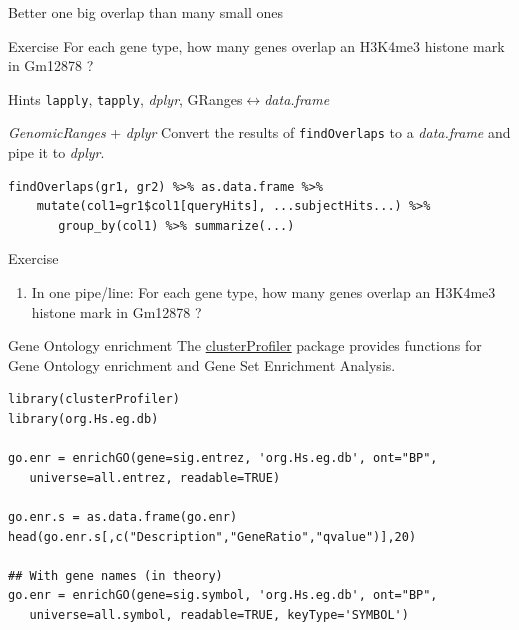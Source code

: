 \documentclass[10pt]{beamer}
\newcommand{\df}{{\it data.frame} }
\begin{document}
\begin{frame}[fragile]{Better one big overlap than many small ones}
  \begin{alertblock}{Exercise}
    For each gene type, how many genes overlap an H3K4me3 histone mark in Gm12878 ?
  \end{alertblock}

  \begin{block}{Hints}
    \verb!lapply!, \verb!tapply!, {\it dplyr}, GRanges$\leftrightarrow$\df
  \end{block}
\end{frame}

\begin{frame}[fragile]{{\it GenomicRanges} + {\it dplyr}}
  Convert the results of \verb!findOverlaps! to a \df and pipe it to {\it dplyr}.
  \bigskip
  
  \begin{block}{}
  \begin{lstlisting}
findOverlaps(gr1, gr2) %>% as.data.frame %>% 
    mutate(col1=gr1$col1[queryHits], ...subjectHits...) %>% 
       group_by(col1) %>% summarize(...)
  \end{lstlisting}
  \end{block}
  \begin{alertblock}{Exercise}
    \begin{enumerate}
    \item In one pipe/line: For each gene type, how many genes overlap an H3K4me3 histone mark in Gm12878 ?
    \end{enumerate}
  \end{alertblock}

\end{frame}


\begin{frame}[fragile]{Gene Ontology enrichment}
  The \href{http://bioconductor.org/packages/release/bioc/html/clusterProfiler.html}{clusterProfiler} package provides functions for Gene Ontology enrichment and Gene Set Enrichment Analysis.
  \bigskip
  
  \begin{block}{}
\begin{lstlisting}
library(clusterProfiler)
library(org.Hs.eg.db)

go.enr = enrichGO(gene=sig.entrez, 'org.Hs.eg.db', ont="BP", 
   universe=all.entrez, readable=TRUE)

go.enr.s = as.data.frame(go.enr)
head(go.enr.s[,c("Description","GeneRatio","qvalue")],20)

## With gene names (in theory)
go.enr = enrichGO(gene=sig.symbol, 'org.Hs.eg.db', ont="BP", 
   universe=all.symbol, readable=TRUE, keyType='SYMBOL')
\end{lstlisting}
  \end{block}
\end{frame}
\end{document}
